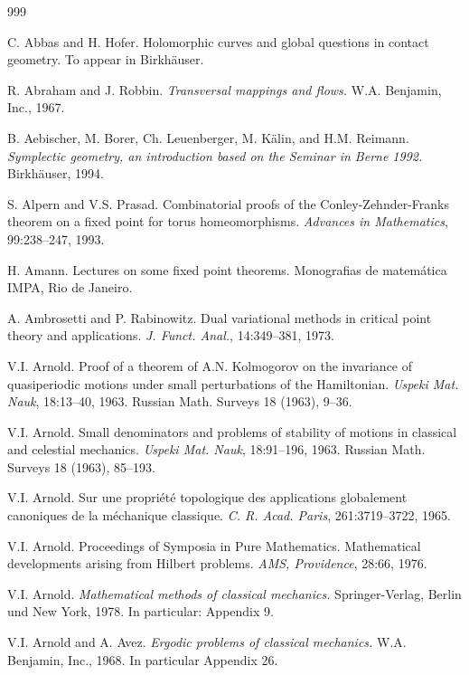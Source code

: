 
\begin{thebibliography}{999}
\raggedright %
{}

 C. Abbas and H. Hofer. Holomorphic curves and global questions in
contact geometry. To appear in Birkhäuser.

 R. Abraham and J. Robbin. \emph{Transversal mappings and flows.}
W.A. Benjamin, Inc., 1967.

 B. Aebischer, M. Borer, Ch. Leuenberger, M. Kälin, and
H.M. Reimann. \emph{Symplectic geometry, an introduction based on
the Seminar in Berne 1992.} Birkhäuser, 1994.

 S. Alpern and V.S. Prasad. Combinatorial proofs of
the Conley-Zehnder-Franks theorem on
a fixed point for torus homeomorphisms. \emph{Advances in Mathematics},
99:238--247, 1993.

 H. Amann. Lectures on some fixed point theorems.
Monografias de matemática IMPA, Rio de Janeiro.

 A. Ambrosetti and P. Rabinowitz. Dual variational methods in
critical point theory and applications. \emph{J. Funct. Anal.},
14:349--381, 1973.

 V.I. Arnold. Proof of a theorem of A.N. Kolmogorov on
the invariance of quasiperiodic motions under small perturbations of
the Hamiltonian. \emph{Uspeki Mat. Nauk}, 18:13--40, 1963.
Russian Math. Surveys 18 (1963), 9--36.

 V.I. Arnold. Small denominators and problems of stability of
motions in classical and celestial mechanics. \emph{Uspeki Mat. Nauk},
18:91--196, 1963. Russian Math. Surveys 18 (1963), 85--193.

 V.I. Arnold. Sur une propriété topologique des applications
globalement canoniques de la méchanique classique. \emph{C. R. Acad. Paris},
261:3719--3722, 1965.

 V.I. Arnold. Proceedings of Symposia in Pure Mathematics.
Mathematical developments arising from Hilbert problems.
\emph{AMS, Providence}, 28:66, 1976.

 V.I. Arnold. \emph{Mathematical methods of classical
mechanics.} Springer-Verlag, Berlin und New York, 1978.
In particular: Appendix 9.

 V.I. Arnold and A. Avez. \emph{Ergodic problems of classical
mechanics.} W.A. Benjamin, Inc., 1968. In particular Appendix 26.


\end{thebibliography}
